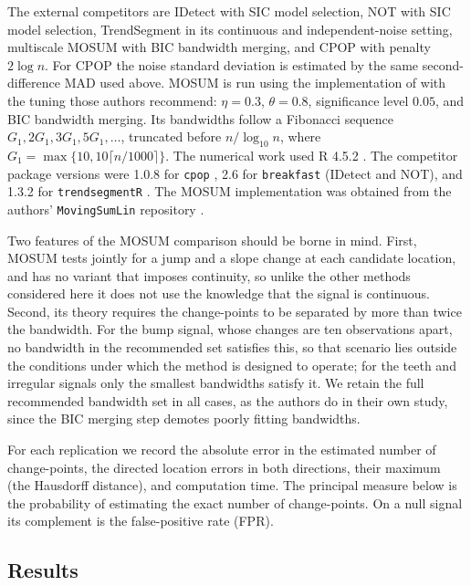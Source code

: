 \documentclass[12pt, a4paper]{article}
\begin{document}
The external competitors are IDetect \citep{af22} with SIC model selection,
NOT \citep{bcf16} with SIC model selection, TrendSegment \citep{mf23} in its
continuous and independent-noise setting, multiscale MOSUM \citep{koc24} with
BIC bandwidth merging, and CPOP \citep{mfl19} with penalty
$2\log n$.  For CPOP the noise standard deviation is estimated by the same
second-difference MAD used above.  MOSUM is run using the implementation of
\cite{koc24} with the tuning those authors recommend: $\eta=0.3$,
$\theta=0.8$, significance level $0.05$, and BIC bandwidth merging.  Its
bandwidths follow a Fibonacci sequence
$G_1,2G_1,3G_1,5G_1,\ldots$, truncated before $n/\log_{10}n$, where
$G_1=\max\{10,10\lceil n/1000\rceil\}$. The numerical work used R 4.5.2 \citep{Rsoftware}. The competitor package versions were 1.0.8 for \texttt{cpop} \citep{cpopSoftware}, 2.6 for \texttt{breakfast} \citep{breakfast} (IDetect and NOT), and 1.3.2 for \texttt{trendsegmentR} \citep{trendsegmentSoftware}. The MOSUM implementation was obtained from the authors' \texttt{MovingSumLin} repository \citep{movingSumLinSoftware}.

Two features of the MOSUM comparison should be borne in mind.  First, MOSUM
tests jointly for a jump and a slope change at each candidate location, and has
no variant that imposes continuity, so unlike the other methods considered here
it does not use the knowledge that the signal is continuous.  Second, its
theory requires the change-points to be separated by more than twice the
bandwidth.  For the bump signal, whose changes are ten observations apart, no
bandwidth in the recommended set satisfies this, so that scenario lies outside
the conditions under which the method is designed to operate; for the teeth and
irregular signals only the smallest bandwidths satisfy it.  We retain the full
recommended bandwidth set in all cases, as the authors do in their own study,
since the BIC merging step demotes poorly fitting bandwidths.

For each replication we record the absolute error in the estimated number of
change-points, the directed location errors in both directions, their maximum
(the Hausdorff distance), and computation time.  The principal
measure below is the probability of estimating the exact number of
change-points.  On a null signal its complement is the false-positive rate
(FPR).

\subsection{Results}
\end{document}
